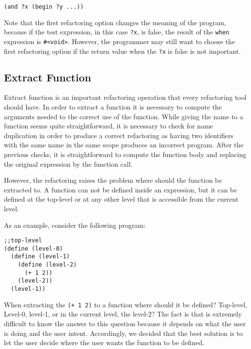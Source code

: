 \begin{lstlisting}[basicstyle=\ttfamily, caption=Refactoring option 2]
(and ?x (begin ?y ...))
\end{lstlisting}

Note that the first refactoring option changes the meaning of the
program, because if the test expression, in this case {\tt ?x}, is
false, the result of the {\tt when} expression is {\tt \#<void>}.
However, the programmer may still want to choose the first refactoring
option if the return value when the {\tt ?x} is false is not
important.%

\subsection{Extract Function}
Extract function is an important refactoring operation that every
refactoring tool should have.  In order to extract a function it is
necessary to compute the arguments needed to the correct use of the
function.  While giving the name to a function seems quite
straightforward, it is necessary to check for name duplication in
order to produce a correct refactoring as having two identifiers with
the same name in the same scope produces an incorrect program.  After
the previous checks, it is straightforward to compute the function
body and replacing the original expression by the function call.

However, the refactoring raises the problem where should the function
be extracted to. A function can not be defined inside an expression,
but it can be defined at the top-level or at any other level that is
accessible from the current level.

As an example, consider the following program:
\begin{lstlisting}[basicstyle=\ttfamily, caption=Extract function levels]
;;top-level
(define (level-0)
  (define (level-1)
    (define (level-2)
      (+ 1 2))
    (level-2))
  (level-1))
\end{lstlisting}

When extracting the {\tt (+ 1 2)} to a function where should it be
defined?  Top-level, Level-0, level-1, or in the current level, the
level-2?  The fact is that is extremely difficult to know the answer
to this question because it depends on what the user is doing and the
user intent.  Accordingly, we decided that the best solution is to let
the user decide where the user wants the function to be defined.


